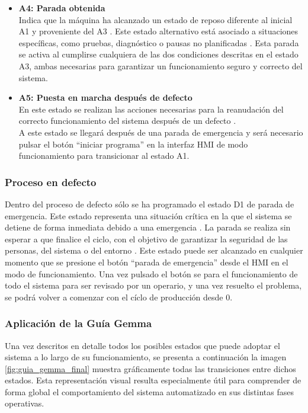 \begin{itemize}
    \item \textbf{A4: Parada obtenida} \\
    Indica que la máquina ha alcanzado un estado de reposo diferente al inicial A1 y proveniente del A3 \cite{guia_gemma}. Este estado alternativo está asociado a situaciones específicas, como pruebas, diagnóstico o pausas no planificadas \cite{guia_gemma}. Esta parada se activa al cumplirse cualquiera de las dos condiciones descritas en el estado A3, ambas necesarias para garantizar un funcionamiento seguro y correcto del sistema.
    
   \item \textbf{A5: Puesta en marcha después de defecto} \\
   En este estado se realizan las acciones necesarias para la reanudación del correcto funcionamiento del sistema después de un defecto \cite{guia_gemma}. \\
   A este estado se llegará después de una parada de emergencia y será necesario pulsar el botón ``iniciar programa'' en la interfaz HMI de modo funcionamiento para transicionar al estado A1.
\end{itemize}

\subsubsection{Proceso en defecto}

Dentro del proceso de defecto sólo se ha programado el estado D1 de parada de emergencia. Este estado representa una situación crítica en la que el sistema se detiene de forma inmediata debido a una emergencia \cite{guia_gemma}. La parada se realiza sin esperar a que finalice el ciclo, con el objetivo de garantizar la seguridad de las personas, del sistema o del entorno \cite{guia_gemma}. Este estado puede ser alcanzado en cualquier momento que se presione el botón ``parada de emergencia'' desde el HMI en el modo de funcionamiento. Una vez pulsado el botón se para el funcionamiento de todo el sistema para ser revisado por un operario, y una vez resuelto el problema, se podrá volver a comenzar con el cíclo de producción desde 0.

\subsubsection{Aplicación de la Guía Gemma}

Una vez descritos en detalle todos los posibles estados que puede adoptar el sistema a lo largo de su funcionamiento, se presenta a continuación la imagen \ref{fig:guia_gemma_final} muestra gráficamente todas las transiciones entre dichos estados. Esta representación visual resulta especialmente útil para comprender de forma global el comportamiento del sistema automatizado en sus distintas fases operativas. 

